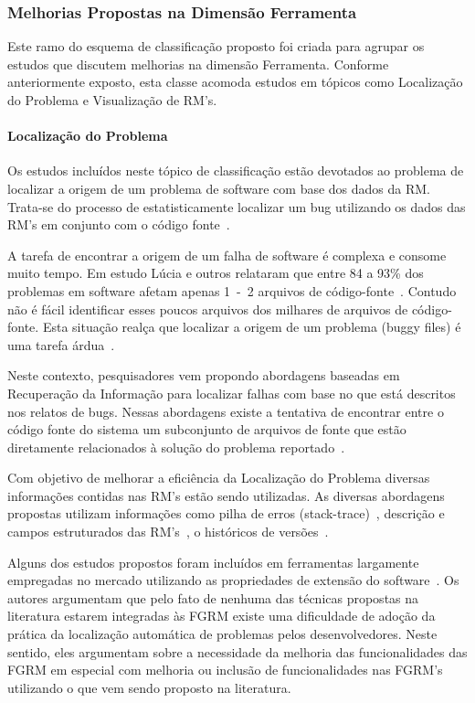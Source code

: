 \subsubsection{Melhorias Propostas na Dimensão Ferramenta}
\label{ssub:melhorias_dim_ferramenta}

Este ramo do esquema de classificação proposto foi criada para
agrupar os estudos que discutem melhorias na dimensão Ferramenta. Conforme
anteriormente exposto, esta classe acomoda estudos em tópicos como Localização
do Problema e Visualização de RM's.

\paragraph{Localização do Problema} Os estudos incluídos neste tópico de
classificação estão devotados ao problema de localizar a origem de um problema
de software com base dos dados da RM\@.  Trata-se do processo de
estatisticamente localizar um bug utilizando os dados das RM's em conjunto com o
código fonte~\cite{Hovemeyer:2004:FBE:1052883.1052895}.

A tarefa de encontrar a origem de um falha de software é complexa e consome
muito tempo. Em estudo Lúcia e outros relataram que entre 84 a 93\% dos
problemas em software afetam apenas 1~-~2 arquivos de
código-fonte~\cite{thung2012faults}. Contudo não é fácil identificar esses
poucos arquivos dos milhares de arquivos de código-fonte. Esta situação realça
que localizar a origem de um problema (buggy files) é uma tarefa
árdua~\cite{Thung:2014:BIT:2635868.2661678}.

Neste contexto, pesquisadores vem propondo abordagens baseadas em Recuperação da
Informação para localizar falhas com base no que está descritos nos relatos de
bugs. Nessas abordagens existe a tentativa de encontrar entre o código fonte do
sistema um subconjunto de arquivos de fonte que estão diretamente relacionados à
solução do problema reportado~\cite{Wong:2014:BBF:2705615.2706096}.

Com objetivo de melhorar a eficiência da Localização do Problema diversas
informações contidas nas RM's estão sendo utilizadas. As diversas abordagens
propostas utilizam informações como pilha de erros
(stack-trace)~\cite{Wong:2014:BBF:2705615.2706096}, des\-cri\-ção e campos
estruturados das RM's~\cite{Thung:2014:BIT:2635868.2661678}, o históricos de
versões~\cite{Bangcharoensap:2012:LSC:2419061.2419428,corley2011recovering,Romo:2015:TAT:2745802.2745833}.

Alguns dos estudos propostos foram incluídos em ferramentas largamente
empregadas no mercado utilizando as propriedades de extensão do
software~\cite{Thung:2014:BIT:2635868.2661678,corley2011recovering}. Os autores
argumentam que pelo fato de nenhuma das técnicas propostas na literatura estarem
integradas às FGRM existe uma dificuldade de adoção da prática da localização
automática de problemas pelos desenvolvedores. Neste sentido, eles argumentam
sobre a necessidade da melhoria das funcionalidades das FGRM em especial com
melhoria ou inclusão de funcionalidades nas FGRM's utilizando o que vem sendo
proposto na literatura.


